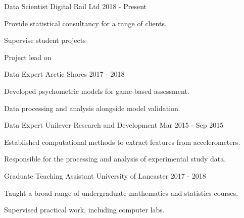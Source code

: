 \begin{cventries}
      
    \cventry
    {Data Scientist}
    {Digital Rail Ltd}
    {}
    {2018 - Present}
    {
      \begin{cvitems}
        \item Provide statistical consultancy for a range of clients.
         \item Supervise student projects
         \item Project lead on 
      \end{cvitems}
    }  
      
     \cventry
    {Data Expert}
    {Arctic Shores}
    {}
    {2017 - 2018}
    {
      \begin{cvitems}
        \item Developed psychometric models for game-based assessment.
         \item Data processing and analysis alongside model validation.
      \end{cvitems}
    }

  \cventry
    {Data Expert}
    {Unilever Research and Development}
    {}
    {Mar 2015 - Sep 2015}
    {
      \begin{cvitems}
        \item Established computational methods to extract features from accelerometers.
        \item Responsible for the processing and analysis of experimental study data.
      \end{cvitems}
    }
    
    \cventry
    {Graduate Teaching Assistant}
    {University of Lancaster}
    {}
    {2017 - 2018}
    {
      \begin{cvitems}
        \item Taught a broad range of undergraduate mathematics and statistics courses.
         \item Supervised practical work, including computer labs.
      \end{cvitems}
    }
\end{cventries}
